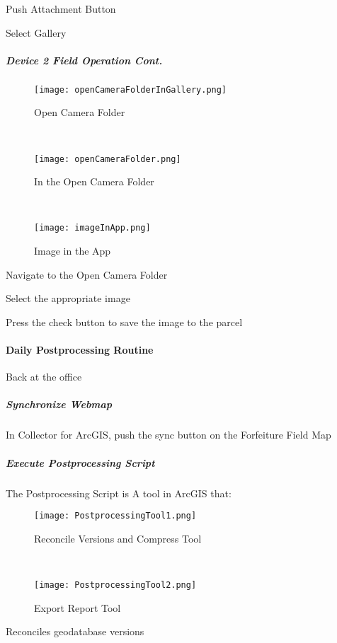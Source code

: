 \documentclass[class=book , crop=false, titlepage, twoside, multi={itemize, figure, verbatim}, float=false]{standalone}
\begin{document}
\noindent Push Attachment Button
\vspace{2in}

\noindent Select Gallery
\clearpage
%
%
%
\subparagraph*{Device 2 Field Operation Cont.}
%
%
\begin{wrapfigure}{r}{0.4\textwidth}
\centering
\texttt{[image: openCameraFolderInGallery.png]}
\caption {Open Camera Folder}
\vspace{.05in}

\HRule \\[.4cm] %
\vspace{.05in}

\texttt{[image: openCameraFolder.png]}
\caption{In the Open Camera Folder}
\vspace{.1in}

\HRule \\[.4cm] %
\vspace{.05in}

\texttt{[image: imageInApp.png]}
\caption{Image in the App}
\end{wrapfigure}
Navigate to the Open Camera Folder
\vspace{2in}

\noindent Select the appropriate image
\vspace{2in}

\noindent Press the check button to save the image to the parcel

\clearpage
%
%
%
\paragraph[Daily Postprocessing Routine]{Daily Postprocessing Routine\texorpdfstring{\\}{}}

Back at the office
\subparagraph[Synchronize Webmap]{Synchronize Webmap\texorpdfstring{\\}{}}

In Collector for ArcGIS, push the sync button on the Forfeiture Field Map
\subparagraph[Execute Postprocessing Script]{Execute Postprocessing Script\texorpdfstring{\\}{}}

The Postprocessing Script is A tool in ArcGIS that:
\begin{wrapfigure}{r}{0.5\textwidth}
\centering
\texttt{[image: PostprocessingTool1.png]}
\caption{Reconcile Versions and Compress Tool}
\vspace{.25in}

\HRule \\[.4cm] %
\vspace{.25in}

\texttt{[image: PostprocessingTool2.png]}
\caption{Export Report Tool}
\end{wrapfigure}
Reconciles geodatabase versions
\vspace{1.5in}
\end{document}
